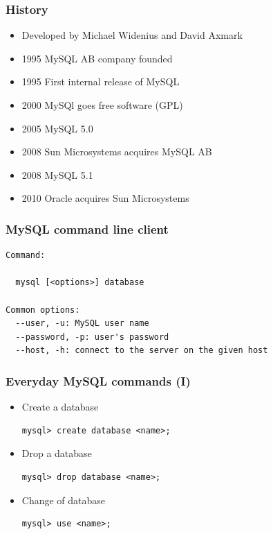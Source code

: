 \documentclass{beamer}
\begin{document}
\begin{frame}
\frametitle{History}

\begin{itemize}
\item Developed by Michael Widenius and David Axmark
\item 1995 MySQL AB company founded
\item 1995 First internal release of MySQL
\item 2000 MySQl goes free software (GPL)
\item 2005 MySQL 5.0
\item 2008 Sun Microsystems acquires MySQL AB
\item 2008 MySQL 5.1
\item 2010 Oracle acquires Sun Microsystems
\end{itemize}

\end{frame}


\begin{frame}[fragile]
\frametitle{MySQL command line client}

\begin{verbatim}
Command:

  mysql [<options>] database

Common options:
  --user, -u: MySQL user name
  --password, -p: user's password
  --host, -h: connect to the server on the given host
\end{verbatim}

\end{frame}


\begin{frame}[fragile]
\frametitle{Everyday MySQL commands (I)}

\begin{itemize}
\item Create a database
\begin{verbatim}
mysql> create database <name>;

\end{verbatim}

\item Drop a database
\begin{verbatim}
mysql> drop database <name>;

\end{verbatim}

\item Change of database
\begin{verbatim}
mysql> use <name>;

\end{verbatim}
\end{itemize}

\end{frame}
\end{document}
